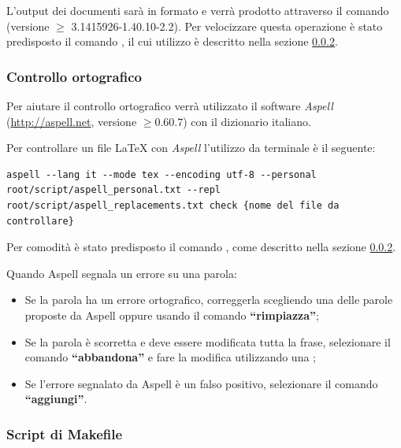 		L'output dei documenti sarà in formato  e verrà prodotto attraverso il comando  (versione $\geq$ 3.1415926-1.40.10-2.2). Per velocizzare questa operazione è stato predisposto il comando , il cui utilizzo è descritto nella sezione \ref{makefile}.
		
		\subsubsection{Controllo ortografico}
		
		Per aiutare il controllo ortografico verrà utilizzato il software \emph{Aspell} (\url{http://aspell.net}, versione $\geq 0.60.7$) con il dizionario italiano.
		
		Per controllare un file \LaTeX{} con \emph{Aspell} l'utilizzo da terminale è il seguente:
\begin{lstlisting}
aspell --lang it --mode tex --encoding utf-8 --personal root/script/aspell_personal.txt --repl root/script/aspell_replacements.txt check {nome del file da controllare}
\end{lstlisting}
		
		Per comodità è stato predisposto il comando , come descritto nella sezione \ref{makefile}.
		
		Quando Aspell segnala un errore su una parola:
		\begin{itemize}
		 \item Se la parola ha un errore ortografico, correggerla scegliendo una delle parole proposte da Aspell oppure usando il comando \textbf{``rimpiazza''};
		 \item Se la parola è scorretta e deve essere modificata tutta la frase, selezionare il comando \textbf{``abbandona''} e fare la modifica utilizzando una ;
		 \item Se l'errore segnalato da Aspell è un falso positivo, selezionare il comando \textbf{``aggiungi''}.
		\end{itemize}

		\subsubsection{Script di Makefile}
		\label{makefile}

